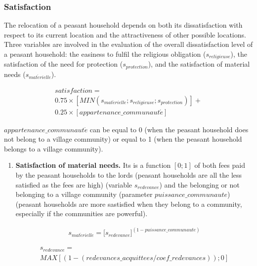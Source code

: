 \documentclass[a4paper,11pt]{article}
\begin{document}
{\subsubsection{Satisfaction}
\begin{sloppypar}
The relocation of a peasant household depends on both its dissatisfaction with respect to its current location and the attractiveness of other possible locations. Three variables are involved in the
evaluation of the overall dissatisfaction level of a peasant household: the easiness to fulfil the religious obligation ($s_ {religieuse}$), the satisfaction of the need for protection ($s_{protection}$), and the satisfaction of material needs ($s_{mat\acute{e}rielle}$).

\begin{small}
\begin{equation}
\begin{gathered}
satisfaction =\\0.75 \times [MIN (s_{mat\acute{e}rielle} ; s_ {religieuse}; s_{protection})] +\\0.25 \times [appartenance\_communaut\acute{e}]
\end{gathered}
\end{equation}
\end{small}

$appartenance\_communaut\acute{e}$ can be equal to 0 (when the peasant household does not belong to a village community) or equal to 1 (when the peasant household belongs to a village community).

\begin{enumerate}
  \item \textbf{Satisfaction of material needs.} 
Its is a function $[0;1]$ of both fees paid by the peasant households to the lords (peasant households are all the less satisfied as the fees are high) (variable $s_{redevance}$) and the belonging or not belonging to a village community (parameter $puissance\_communaute$) (peasant households are more sastisfied when they belong to a community, especially if the communities are powerful).

\begin{small}
\begin{equation}
\begin{gathered}
s_{mat\acute{e}rielle} =\lbrack s_{redevance}\rbrack^{(1-puissance\_communaute)}
\end{gathered}
\end{equation}

\begin{equation}
\begin{gathered}
s_{redevance} =\\ MAX [ (1- (redevances\_acquittees / coef\_redevances)) ; 0]
\end{gathered}
\end{equation}
\end{small}


\end{enumerate}
\end{sloppypar}}
\end{document}

